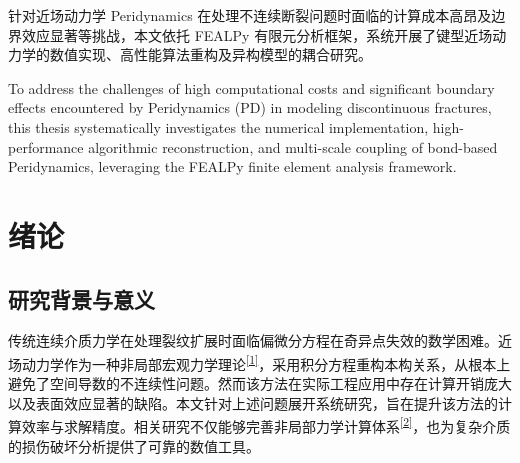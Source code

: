 \documentclass{xtu_thesis}
\begin{document}
	
	\frontmatter
	
	\chineseabstract
	
	\begin{abstractcn}
		针对近场动力学 Peridynamics 在处理不连续断裂问题时面临的计算成本高昂及边界效应显著等挑战，本文依托 FEALPy 有限元分析框架，系统开展了键型近场动力学的数值实现、高性能算法重构及异构模型的耦合研究。
	\end{abstractcn}
	
	
	\englishabstract
	
	\begin{abstracten}
		To address the challenges of high computational costs and significant boundary effects encountered by Peridynamics (PD) in modeling discontinuous fractures, this thesis systematically investigates the numerical implementation, high-performance algorithmic reconstruction, and multi-scale coupling of bond-based Peridynamics, leveraging the FEALPy finite element analysis framework. 
	\end{abstracten}
	
	
	\tableofcontentscustom
	
	\mainmatter
	\section{绪论}
	
	\subsection{研究背景与意义}
	传统连续介质力学在处理裂纹扩展时面临偏微分方程在奇异点失效的数学困难。近场动力学作为一种非局部宏观力学理论\textsuperscript{\hyperlink{ref:silling2000}{[1]}}，采用积分方程重构本构关系，从根本上避免了空间导数的不连续性问题。然而该方法在实际工程应用中存在计算开销庞大以及表面效应显著的缺陷。本文针对上述问题展开系统研究，旨在提升该方法的计算效率与求解精度。相关研究不仅能够完善非局部力学计算体系\textsuperscript{\hyperlink{ref:madenci2014}{[2]}}，也为复杂介质的损伤破坏分析提供了可靠的数值工具。
	
\end{document}
